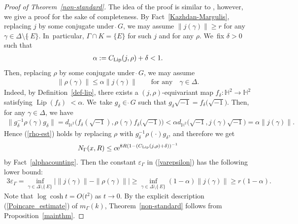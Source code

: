 \documentclass[10pt,a4paper]{amsart}
\numberwithin{equation}{section}
\begin{document}
\begin{proof}[Proof of Theorem~\ref{non-standard}]
The idea of the proof is similar to \cite[Theorem~9.9]{KaKob16},
however, we give a proof for the sake of completeness.
By Fact~\ref{Kazhdan-Margulis},
replacing $j$ by some conjugate under $\grave{\ }G$,
we may assume $\|j(\gamma)\|\geq r$ for any
$\gamma\in\Delta\setminus\{\grave{\ }E\}$. In~particular, $\Gamma\cap K=\{E\}$ for such $j$ and for any $\rho$. We~fix $\delta>0$ such that
\begin{gather*}
\alpha := C_{\rm Lip}(j,\rho) + \delta<1.
\end{gather*}
Then, replacing $\rho$ by some conjugate under $\grave{\ }G$,
we may assume
\begin{gather}
\label{rho-est}
\|\rho(\gamma)\| \leq \alpha \|j(\gamma)\|\qquad
\text{for any} \quad\gamma\in\Delta.
\end{gather}
Indeed, by Definition~\ref{def-lip},
there exists a $(j,\rho)$-equivariant map
$f_{\delta}\colon\mathbb{H}^2\rightarrow\mathbb{H}^2$
satisfying $\operatorname{Lip}(f_{\delta})$ $< \alpha$. We~take $g_{\delta}\in\grave{\ }G$ such that $g_{\delta}\sqrt{-1}=f_{\delta}\big(\sqrt{-1}\big)$.
Then, for any $\gamma\in\Delta$, we have
\begin{gather*}
\big\|g_{\delta}^{-1}\rho(\gamma)g_{\delta}\big\| =
d_{\mathbb{H}^{2}}\big(f_{\delta}(\sqrt{-1}), \rho(\gamma)f_{\delta}\big(\sqrt{-1}\big)\big)
< \alpha d_{\mathbb{H}^{2}}\big(\sqrt{-1},j(\gamma)\sqrt{-1}\big)
=\alpha \|j(\gamma)\|.
\end{gather*}
Hence (\ref{rho-est}) holds by replacing $\rho$ with $g_{\delta}^{-1}\rho(\cdot)g_{\delta}$,
and therefore we get
\begin{gather*}
N_{\Gamma}(x,R) \leq c{\rm e}^{8R(1-(C_{\rm Lip}(j,\rho)+\delta))^{-1}}
\end{gather*}
by Fact~\ref{alphacounting}. Then the constant $\varepsilon_{\Gamma}$
in (\ref{varepsilon}) has the following lower bound:
\begin{gather*}
3\varepsilon_{\Gamma}
=\inf_{\gamma\in\Delta\setminus\{\grave{\ }E\}}
\left|\|j(\gamma)\| - \|\rho(\gamma)\|\right|
\geq \inf_{\gamma\in\Delta\setminus\{\grave{\ }E\}}(1-\alpha)
\|j(\gamma)\| \geq r(1-\alpha).
\end{gather*}
Note that
$\log\cosh t=O\big(t^{2}\big)$ as $t\to0$.
By the explicit description (\ref{Poincare_estimate})
of $m_{\Gamma}(k)$,
Theorem~\ref{non-standard} follows from Proposition~\ref{mainthm}.
\end{proof}
\end{document}
